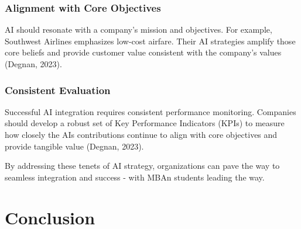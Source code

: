 \documentclass[
]{book}
\begin{document}
\hypertarget{alignment-with-core-objectives}{%
\subsection{Alignment with Core Objectives}\label{alignment-with-core-objectives}}

AI should resonate with a company's mission and objectives. For example, Southwest Airlines emphasizes low-cost airfare. Their AI strategies amplify those core beliefs and provide customer value consistent with the company's values (Degnan, 2023).

\hypertarget{consistent-evaluation}{%
\subsection{Consistent Evaluation}\label{consistent-evaluation}}

Successful AI integration requires consistent performance monitoring. Companies should develop a robust set of Key Performance Indicators (KPIs) to measure how closely the AIs contributions continue to align with core objectives and provide tangible value (Degnan, 2023).

By addressing these tenets of AI strategy, organizations can pave the way to seamless integration and success - with MBAn students leading the way.

\hypertarget{conclusion}{%
\chapter{Conclusion}\label{conclusion}}
\end{document}
